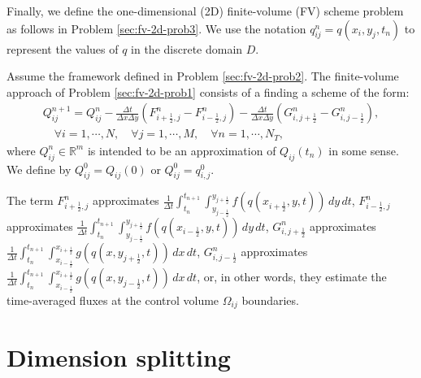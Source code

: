 Finally, we define the one-dimensional (2D) finite-volume (FV)
scheme problem as follows in Problem \ref{sec:fv-2d-prob3}.
We use the notation ${q}^n_{ij} = {q}(x_i, y_j, t_n)$
to represent the values of ${q}$ in the discrete domain $D$.
\begin{prob}[2D-FV scheme]
	\label{sec:fv-2d-prob3}
	Assume the framework defined in Problem \ref{sec:fv-2d-prob2}.
	The finite-volume approach of Problem \ref{sec:fv-2d-prob1}
	consists of a finding a scheme of the form:
	\begin{align*}
		{Q}_{ij}^{n+1} =  {Q}_{ij}^{n} -
		\frac{\Delta t}{\Delta x \Delta y} ({F}_{i+\frac{1}{2},j}^{n} - {F}_{i-\frac{1}{2},j}^{n}) -
		\frac{\Delta t}{\Delta x \Delta y} ({G}_{i,j+\frac{1}{2}}^{n} - {G}_{i,j-\frac{1}{2}}^{n}),
		\\ \nonumber \quad \forall i = 1, \cdots, N, \quad \forall j = 1, \cdots, M,
		\quad \forall n = 1, \cdots, N_T,
	\end{align*}
	where ${Q}_{ij}^{n} \in \mathbb{R}^m$ is intended to be an approximation
	of ${Q}_{ij}(t_{n})$ in some sense. We define by ${Q}_{ij}^{0} = {Q}_{ij}(0)$ or
	${Q}_{ij}^{0} = {q}^0_{i,j}$.
	
	The term ${F}_{i+\frac{1}{2}, j}^{n}$ approximates
	$\frac{1}{\Delta t}\int_{t_n}^{t_{n+1}} \int_{y_{j-\frac{1}{2}}}^{y_{j+\frac{1}{2}}} {f}({q}(x_{i+\frac{1}{2}}, y, t)) \,dy \,dt $,
	${F}_{i-\frac{1}{2},j}^{n}$ approximates
	$\frac{1}{\Delta t}\int_{t_n}^{t_{n+1}} \int_{y_{j-\frac{1}{2}}}^{y_{j+\frac{1}{2}}} {f}({q}(x_{i-\frac{1}{2}}, y, t)) \,dy \,dt $,
	${G}_{i, j+\frac{1}{2}}^{n}$ approximates
	$\frac{1}{\Delta t}\int_{t_n}^{t_{n+1}} \int_{x_{i-\frac{1}{2}}}^{x_{i+\frac{1}{2}}} {g}({q}(x, y_{j+\frac{1}{2}}, t)) \,dx \,dt $,
	${G}_{i, j-\frac{1}{2}}^{n}$ approximates
	$\frac{1}{\Delta t}\int_{t_n}^{t_{n+1}} \int_{x_{i-\frac{1}{2}}}^{x_{i+\frac{1}{2}}} {g}({q}(x, y_{j-\frac{1}{2}}, t)) \,dx \,dt $,
	or, in other words, they estimate the time-averaged fluxes at the control volume $\Omega_{ij}$ boundaries.
\end{prob}



\section{Dimension splitting}
\label{sec-dimsplit}


\citep{lin:1997}
\citep{lin:2004}
\citep{putmanthesis:2007}
\citep{putman:2007}
